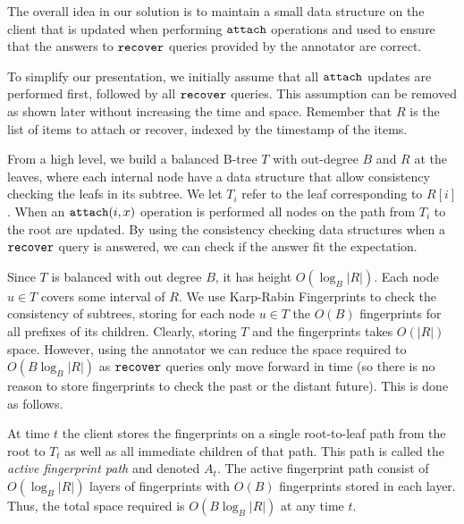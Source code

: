     The overall idea in our solution is to maintain a small data structure on the client that is updated when performing $\mathtt{attach}$ operations and used to ensure that the answers to $\mathtt{recover}$ queries provided by the annotator are correct.

    To simplify our presentation, we initially assume that all $\mathtt{attach}$ updates are performed first, followed by all $\mathtt{recover}$ queries. This assumption can be removed as shown later without increasing the time and space.
    Remember that $R$ is the list of items to attach or recover, indexed by the timestamp of the items.
    
    From a high level, we build a balanced B-tree $T$ with out-degree $B$ and $R$ at the leaves, where each internal node have a data structure that allow consistency checking the leafs in its subtree. We let $T_i$ refer to the leaf corresponding to $R[i]$. When an $\mathtt{attach}(i, x)$ operation is performed all nodes on the path from $T_i$ to the root are updated. By using the consistency checking data structures when a $\mathtt{recover}$ query is answered, we can check if the answer fit the expectation.
        
    Since $T$ is balanced with out degree $B$, it has height $O(\log_B |R|)$. Each node $u \in T$ covers some interval of $R$. We use Karp-Rabin Fingerprints to check the consistency of subtrees, storing for each node $u \in T$ the $O(B)$ fingerprints for all prefixes of its children. Clearly, storing $T$ and the fingerprints takes $O(|R|)$ space. However, using the annotator we can reduce the space required to $O(B \log_B |R|)$ as $\mathtt{recover}$ queries only move forward in time (so there is no reason to store fingerprints to check the past or the distant future). This is done as follows.
    
    At time $t$ the client stores the fingerprints on a single root-to-leaf path from the root to $T_t$ as well as all immediate children of that path. This path is called the \emph{active fingerprint path} and denoted $A_t$. The active fingerprint path consist of $O(\log_B |R|)$ layers of fingerprints with $O(B)$ fingerprints stored in each layer. Thus, the total space required is $O(B \log_B |R|)$ at any time $t$.
    
